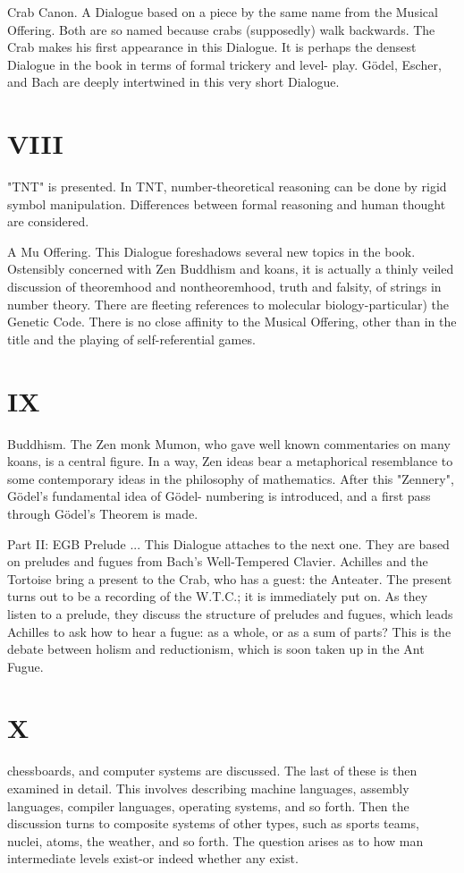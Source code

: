 Crab Canon. A Dialogue based on a piece by the same name from the Musical Offering. Both are so named because crabs (supposedly) walk backwards. The Crab makes his first appearance in this Dialogue. It is perhaps the densest Dialogue in the book in terms of formal trickery and level- play. Gödel, Escher, and Bach are deeply intertwined in this very short Dialogue. 


\chapter {VIII}
"TNT" is presented. In TNT, number-theoretical reasoning can be done by rigid symbol manipulation. Differences between formal reasoning and human thought are considered. 

A Mu Offering. This Dialogue foreshadows several new topics in the book. Ostensibly concerned with Zen Buddhism and koans, it is actually a thinly veiled discussion of theoremhood and nontheoremhood, truth and falsity, of strings in number theory. There are fleeting references to molecular biology-particular) the Genetic Code. There is no close affinity to the Musical Offering, other than in the title and the playing of self-referential games. 


\chapter {IX}
Buddhism. The Zen monk Mumon, who gave well known commentaries on many koans, is a central figure. In a way, Zen ideas bear a metaphorical resemblance to some contemporary ideas in the philosophy of mathematics. After this "Zennery", Gödel’s fundamental idea of Gödel- numbering is introduced, and a first pass through Gödel’s Theorem is made. 

Part II: EGB Prelude ... This Dialogue attaches to the next one. They are based on preludes and fugues from Bach's Well-Tempered Clavier. Achilles and the Tortoise bring a present to the Crab, who has a guest: the Anteater. The present turns out to be a recording of the W.T.C.; it is immediately put on. As they listen to a prelude, they discuss the structure of preludes and fugues, which leads Achilles to ask how to hear a fugue: as a whole, or as a sum of parts? This is the debate between holism and reductionism, which is soon taken up in the Ant Fugue. 


\chapter {X}
chessboards, and computer systems are discussed. The last of these is then examined in detail. This involves describing machine languages, assembly languages, compiler languages, operating systems, and so forth. Then the discussion turns to composite systems of other types, such as sports teams, nuclei, atoms, the weather, and so forth. The question arises as to how man intermediate levels exist-or indeed whether any exist. 







